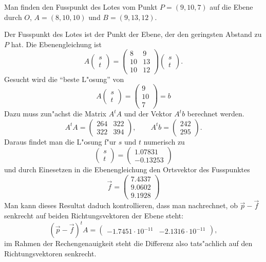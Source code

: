 \begin{beispiel}
Man finden den Fusspunkt des Lotes vom Punkt $P=(9,10,7)$ auf die Ebene
durch $O$, $A=(8,10,10)$ und $B=(9,13,12)$.

Der Fusspunkt des Lotes ist der Punkt der Ebene, der den geringsten
Abstand zu $P$ hat. Die Ebenengleichung ist
\[
A\begin{pmatrix}s\\t\end{pmatrix}=
\begin{pmatrix}
 8& 9\\
10&13\\
10&12
\end{pmatrix}
\begin{pmatrix}s\\t\end{pmatrix}.
\]
Gesucht wird die ``beste L"osung'' von
\[
A\begin{pmatrix}s\\t\end{pmatrix}=\begin{pmatrix}9\\10\\7\end{pmatrix}=b
\]
Dazu muss zun"achst die Matrix $A^tA$ und der Vektor $A^tb$
berechnet werden.
\[
A^tA=\begin{pmatrix}
264&322\\
322&394
\end{pmatrix}
,\qquad
A^tb=\begin{pmatrix}
242\\295
\end{pmatrix}.
\]
Daraus findet man die L"osung f"ur $s$ und $t$ numerisch zu
\[
\begin{pmatrix}s\\t \end{pmatrix}
=
\begin{pmatrix}
   1.07831\\
  -0.13253
\end{pmatrix}
\]
und durch Einesetzen in die Ebenengleichung den Ortsvektor des Fusspunktes
\[
\vec f = \begin{pmatrix}
   7.4337\\
   9.0602\\
   9.1928
\end{pmatrix}
\]
Man kann dieses Resultat daduch kontrollieren, dass man nachrechnet, ob
$\vec p-\vec f$ senkrecht auf beiden Richtungsvektoren der Ebene
steht:
\[
(\vec p-\vec f)^tA=\begin{pmatrix}
  -1.7451\cdot10^{-11}&  -2.1316\cdot 10^{-11}
\end{pmatrix},
\]
im Rahmen der Rechengenauigkeit steht die Differenz also tats"achlich auf
den Richtungsvektoren senkrecht.
\end{beispiel}

